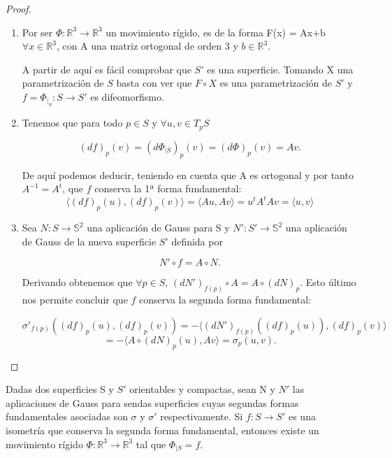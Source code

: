 \begin{proof}
	${ }$%
	\begin{enumerate}
		\item Por ser $ \Phi : \mathbb{R}^3 \to \mathbb{R}^3 $ un movimiento rígido, es de la forma F(x) = Ax+b $\forall x \in \mathbb{R}^3$, con A una matriz ortogonal de orden 3 y $b \in \mathbb{R}^3$.
		
		A partir de aquí es fácil comprobar que $S'$ es una superficie. Tomando X una parametrización de $S$ basta con ver que $F\circ X$ es una parametrización de $S'$ y $f = \Phi_{\mid_{S}} : S \to S'$ es difeomorfismo.
		
		
		\item Tenemos que para todo $p \in S$ y $\forall u, v \in T_p S$
		
		\[
		(df)_p(v) = (d\Phi_{\mid S})_p(v) = (d\Phi)_p(v) = Av.
		\]
		
		De aquí podemos deducir, teniendo en cuenta que A es ortogonal y por tanto $A^{-1} = A^t$, que $f$ conserva la 1ª forma fundamental:
		\[
		\langle (df)_p(u), (df)_p(v) \rangle = \langle Au, Av \rangle = u^tA^tAv = \langle u, v \rangle
		\]
		
		\item Sea $N : S \to \mathbb{S}^2$ una aplicación de Gauss para S y $N' : S' \to \mathbb{S}^2$ una aplicación de Gauss de la nueva superficie $S'$ definida por
		
		\[
		N'\circ f = A\circ N.
		\]
		
		Derivando obtenemos que $\forall p \in S$,  $(dN')_{f(p)}\circ A = A \circ (dN)_p$. Esto último nos permite concluir que $f$ conserva la segunda forma fundamental:
		
		\[
		\sigma'_{f(p)}((df)_p(u), (df)_p(v)) = - \langle (dN')_{f(p)}((df)_p(u)), (df)_p(v) \rangle
		\]
		\[
		= - \langle A\circ(dN)_p(u), Av \rangle = \sigma_p(u, v).
		\]
	\end{enumerate}
\end{proof}

\begin{teorema}
	Dadas dos superficies S y $S'$ orientables y compactas, sean N y $N'$ las aplicaciones de Gauss para sendas superficies cuyas segundas formas fundamentales asociadas son $\sigma$ y $\sigma'$ respectivamente.
	Si $f : S \to S'$ es una isometría que conserva la segunda forma fundamental, entonces existe un movimiento rígido $\Phi : \mathbb{R}^3 \to \mathbb{R}^3$ tal que $\Phi_{\mid S} = f$.
\end{teorema}

